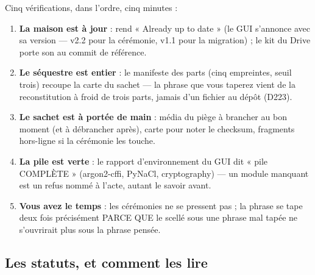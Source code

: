 Cinq vérifications, dans l'ordre, cinq minutes :

\begin{enumerate}
\item \textbf{La maison est à jour} :  rend « Already up to date »
(le GUI s'annonce avec sa version — v2.2 pour la cérémonie, v1.1 pour la migration) ;
le kit du Drive porte son  au commit de référence.
\item \textbf{Le séquestre est entier} : le manifeste des parts (cinq
empreintes, seuil trois) recoupe la carte du sachet — la phrase que vous
taperez vient de la reconstitution à froid de trois parts, jamais d'un
fichier au dépôt (D223).
\item \textbf{Le sachet est à portée de main} : média du piège à brancher au bon
moment (et à débrancher après), carte pour noter le checksum, fragments hors-ligne si
la cérémonie les touche.
\item \textbf{La pile est verte} : le rapport d'environnement du GUI dit
« pile COMPLÈTE » (argon2-cffi, PyNaCl, cryptography) — un module manquant est un
refus nommé à l'acte, autant le savoir avant.
\item \textbf{Vous avez le temps} : les cérémonies ne se pressent pas ; la phrase se
tape deux fois précisément PARCE QUE le scellé sous une phrase mal tapée ne
s'ouvrirait plus sous la phrase pensée.
\end{enumerate}

\subsection{Les statuts, et comment les lire}\label{sec:statuts}

